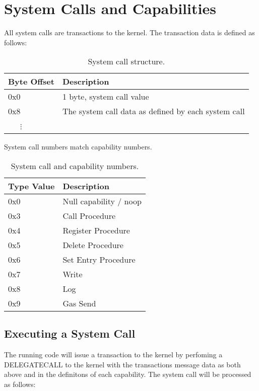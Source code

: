 \documentclass[english,a4paper]{article}
\begin{document}
\section{System Calls and Capabilities}
All system calls are transactions to the kernel. The transaction data is defined
as follows:

\begin{table}[H]
  \caption{System call structure.}
  \centering{}%
  \begin{tabular}{l|p{}}
    \hline
    Byte Offset & Description\tabularnewline
    \hline
    \hline
    0x0 & 1 byte, system call value \tabularnewline
    0x8 & The system call data as defined by each system call \tabularnewline
    ~~~$\vdots$ &  \tabularnewline
    \hline
  \end{tabular}
\end{table}

System call numbers match capability numbers.

\begin{table}[H]
  \caption{System call and capability numbers.\label{syscall-numbers}}
  \centering{}%
  \begin{tabular}{l|p{}}
    \hline
    Type Value & Description\tabularnewline
    \hline
    \hline
    0x0 & Null capability / noop \tabularnewline
    0x3 & Call Procedure \tabularnewline
    0x4 & Register Procedure \tabularnewline
    0x5 & Delete Procedure \tabularnewline
    0x6 & Set Entry Procedure \tabularnewline
    0x7 & Write \tabularnewline
    0x8 & Log \tabularnewline
    0x9 & Gas Send \tabularnewline
    \hline
  \end{tabular}
\end{table}

\subsection{Executing a System Call}
The running code will issue a transaction to the kernel by perfoming a
DELEGATECALL to the kernel with the transactions message data as both above and
in the definitons of each capability. The system call will be processed as
follows:
\end{document}
